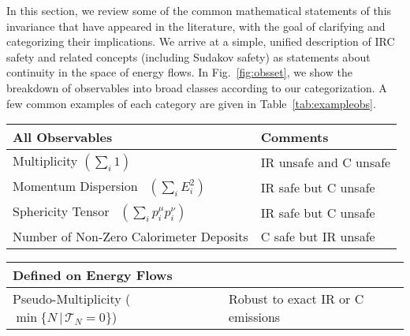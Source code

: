 \documentclass[letterpaper,11pt]{article}
\DeclareRobustCommand{\Tab}[1]{Table~\ref{#1}}
\DeclareRobustCommand{\Fig}[1]{Fig.~\ref{#1}}
\begin{document}
In this section, we review some of the common mathematical statements of this invariance that have appeared in the literature, with the goal of clarifying and categorizing their implications.
%
We arrive at a simple, unified description of IRC safety and related concepts (including Sudakov safety) as statements about continuity in the space of energy flows.
%
In \Fig{fig:obsset}, we show the breakdown of observables into broad classes according to our categorization.
%
A few common examples of each category are given in \Tab{tab:exampleobs}.


\begin{table}[p]
\begin{flushright}

\begin{tabular}{p{} p{}}
\hline\hline
\cellcolor{table_red_bg} \textbf{\textcolor{table_red}{All Observables}} & \cellcolor{table_red_bg} Comments \\
 \hline
\cellcolor{table_red_bg} Multiplicity $\left(\sum_i 1\right)$ & \cellcolor{table_red_bg}  IR unsafe and C unsafe\\
\cellcolor{table_red_bg} Momentum Dispersion~\cite{CMS:2013kfa} $\left(\sum_i E_i^2 \right)$ & \cellcolor{table_red_bg}  IR safe but C unsafe\\ 
\cellcolor{table_red_bg} Sphericity Tensor~\cite{Bjorken:1969wi} $\left(\sum_i p_i^\mu p_i^\nu \right)$ & \cellcolor{table_red_bg}  IR safe but C unsafe\\
\cellcolor{table_red_bg} Number of Non-Zero Calorimeter Deposits & \cellcolor{table_red_bg}  C safe but IR unsafe \\
  \hline \hline
\end{tabular}

\begin{tabular}{p{} p{}}
 \multicolumn{2}{l}{\cellcolor{table_yellow_bg} \textbf{\textcolor{table_yellow}{Defined on Energy Flows}}} \\
\hline
\cellcolor{table_yellow_bg} Pseudo-Multiplicity ($\min \{N\, |\, \mathcal T_N = 0\}$)& \cellcolor{table_yellow_bg} Robust to exact IR or C emissions\\
\hline  \hline
\end{tabular}


\end{flushright}
\end{table}
\end{document}
